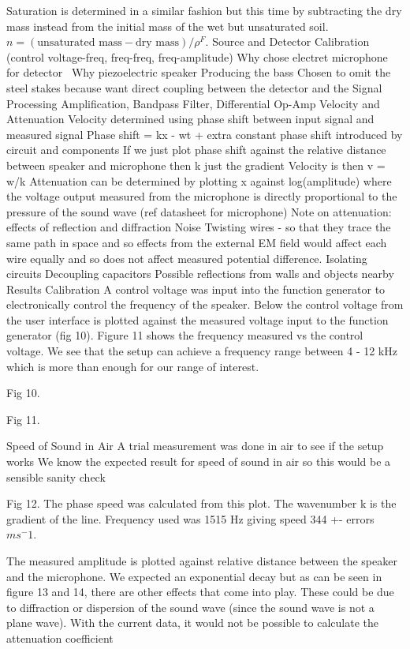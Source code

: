 \documentclass[twocolumn]{article}
\begin{document}
Saturation is determined in a similar fashion but this time by subtracting the dry mass instead from the initial mass of the wet but unsaturated soil. $n = (\text{unsaturated mass} - \text{dry mass}) / \rho^F$.
Source and Detector
Calibration (control voltage-freq, freq-freq, freq-amplitude)
Why chose electret microphone for detector~\cite{mankin_hubbard_weaver_2000}
Why piezoelectric speaker
Producing the bass
Chosen to omit the steel stakes because want direct coupling between the detector and the
Signal Processing
Amplification, Bandpass Filter, Differential Op-Amp
Velocity and Attenuation
Velocity determined using phase shift between input signal and measured signal
Phase shift = kx - wt + extra constant phase shift introduced by circuit and components
If we just plot phase shift against the relative distance between speaker and microphone then k just the gradient
Velocity is then v = w/k
Attenuation can be determined by plotting x against log(amplitude) where the voltage output measured from the microphone is directly proportional to the pressure of the sound wave (ref datasheet for microphone)
Note on attenuation: effects of reflection and diffraction
Noise
Twisting wires - so that they trace the same path in space and so effects from the external EM field would affect each wire equally and so does not affect measured potential difference.
Isolating circuits
Decoupling capacitors
Possible reflections from walls and objects nearby
Results
Calibration
A control voltage was input into the function generator to electronically control the frequency of the speaker. Below the control voltage from the user interface is plotted against the measured voltage input to the function generator (fig 10). Figure 11 shows the frequency measured vs the control voltage. We see that the setup can achieve a frequency range between 4 - 12 kHz which is more than enough for our range of interest.

Fig 10.

Fig 11.

Speed of Sound in Air
A trial measurement was done in air to see if the setup works
We know the expected result for speed of sound in air so this would be a sensible sanity check

Fig 12.
The phase speed was calculated from this plot. The wavenumber k is the gradient of the line. Frequency used was 1515 Hz giving speed 344 +- errors $ms^-1$.

The measured amplitude is plotted against relative distance between the speaker and the microphone. We expected an exponential decay but as can be seen in figure 13 and 14, there are other effects that come into play. These could be due to diffraction or dispersion of the sound wave (since the sound wave is not a plane wave).
With the current data, it would not be possible to calculate the attenuation coefficient
\end{document}

